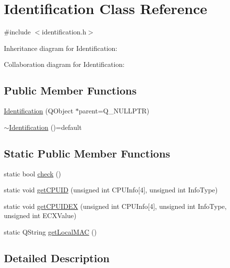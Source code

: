 \hypertarget{class_identification}{}\section{Identification Class Reference}
\label{class_identification}


{\ttfamily \#include $<$identification.\+h$>$}



Inheritance diagram for Identification\+:


Collaboration diagram for Identification\+:
\subsection*{Public Member Functions}
\begin{DoxyCompactItemize}
\item 
\mbox{\hyperlink{class_identification_a5634a37b031a23098a7cb0c707424bba}{Identification}} (Q\+Object $\ast$parent=Q\+\_\+\+N\+U\+L\+L\+P\+TR)
\item 
\mbox{\hyperlink{class_identification_adfc0f9b4ad6867c277a65b6bcba8206e}{$\sim$\+Identification}} ()=default
\end{DoxyCompactItemize}
\subsection*{Static Public Member Functions}
\begin{DoxyCompactItemize}
\item 
static bool \mbox{\hyperlink{class_identification_a829ac09ef7f43aafe7abc6f807c6df9f}{check}} ()
\item 
static void \mbox{\hyperlink{class_identification_a2c6a597de6b24679e755aafba5657fef}{get\+C\+P\+U\+ID}} (unsigned int C\+P\+U\+Info\mbox{[}4\mbox{]}, unsigned int Info\+Type)
\item 
static void \mbox{\hyperlink{class_identification_ad6429aef1faa0a8bb9bd423998bb8889}{get\+C\+P\+U\+I\+D\+EX}} (unsigned int C\+P\+U\+Info\mbox{[}4\mbox{]}, unsigned int Info\+Type, unsigned int E\+C\+X\+Value)
\item 
static Q\+String \mbox{\hyperlink{class_identification_aecfba4e5f0c1640f52a6e2b8e01e457e}{get\+Local\+M\+AC}} ()
\end{DoxyCompactItemize}


\subsection{Detailed Description}


